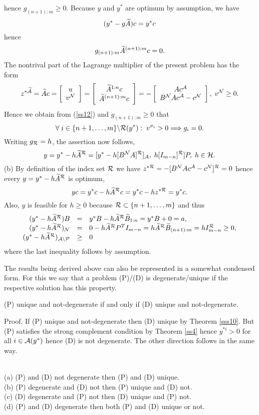 hence $g_{(n+1):m} \geq 0$.
Because $y$ and $y^*$ are optimum by assumption, we have
\[
(y^* - g\wi{A})c = y^*c
\]
hence
\begin{equation} \label{ss12}
g_{(n+1):m}\wi{A}^{(n+1):m}c = 0.
\end{equation}
The nontrival part of the {\sc Lagrange} multiplier of the present problem has
the form
\[
z^{*\wi{\A}} = \wi{A}c = \ba{[}{c}u\\ v^{\N}\ea{]}
 = \ba{[}{c}\wi{A}^{1:n}c \\  \wi{A}^{(n+1):m}c\ea{]}
= - \ba{[}{c} Ac^{\A}\\ B^{\N}Ac^{\A} - c^{\N}\ea{]},
\; v^{\N} \geq 0.
\]
Hence we obtain from (\ref{ss12}) and
$g_{(n+1):m} \geq 0$ that
\[
\forall \; i \in \{n+1,\ldots,m\} \backslash \R(y^*): \; v^{\sigma _i} > 0
\Longrightarrow g_i = 0.
\]
Writing $g_{\R} = h$, the assertion now follows,
\[
y = y^* - h\wi{A}^{\R}
 = [y^* - h[B^{\N}A]^{\R}]_{\A}, \; h[I_{m-n}]^{\R}]P, \; h \in {\cal H}.
\]
(b) By definition of the index set $\R$ we have $z^{*\R} = -
[B^{\N}Ac^{\A} - c^{\N}]^{\R} = 0$ hence every $y = y^*
- h\wi{A}^{\R}$ is optimum,
\[
yc = y^*c - h\wi{A}^{\R}c = y^*c - hz^{*\R} = y^*c.
\]
Also, $y$ is feasible for $h \geq 0$ because $\R \subset \{n+1,\ldots,m\}$
and thus
%
\[ \ba{.}{rcl}
(y^* - h\wi{A}^{\R})B &=&
y^*B - h\wi{A}^{\R}\wi{B}_{1:n} = y^*B + 0 = a,\\
(y^* - h\wi{A}^{\R})_{\N} &=&  0 - h\wi{A}^{\R}P^TI_{m-n}
= h\wi{A}^{\R}\wi{B}_{(n+1):m} = hI^{\R}_{m-n} \geq 0, \\
(y^* - h\wi{A}^{\R})_{\A \backslash \P} &\geq& 0
\ea{.}
\]
where the last inequality follows by assumption.
\par
The results being derived above can also be represented in a somewhat condensed
form.  For this we say that a problem (P)/(D) is degenerate/unique if the
respective solution has this property.
%
\begin{corollary} \label{cs1} (P) unique and not-degenerate if and only if (D)
unique and not-degenerate.
\end{corollary}
%
Proof. If (P) unique and not-degenerate then (D) unique by Theorem \ref{sss10}.
But (P) satisfies the strong complement condition by Theorem \ref{ss4} hence
$y^{*i} > 0$ for all $i \in \A(y^*)$ hence (D) is not degenerate. The other
direction follows in the same way.
\par
\begin{corollary} \label{cs2} \hfill\\
(a) (P) and (D) not degenerate then (P) and (D) unique.\\
(b) (P) degenerate and (D) not then (P) unique and (D) not.\\
(c) (D) degenerate and (P) not then (D) unique and (P) not.\\
(d) (P) and (D) degenerate then both (P) and (D) unique or not.
\end{corollary}
